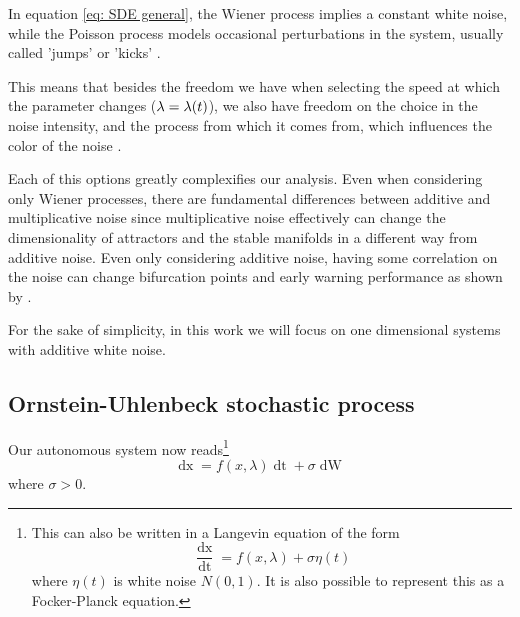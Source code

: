 In equation \eqref{eq: SDE general}, the Wiener process implies a constant white noise, while the Poisson process models occasional perturbations in the system, usually called 'jumps' or 'kicks' \citep{bibid}.

This means that besides the freedom we have when selecting the speed at which the parameter changes ($\lambda=\lambda(t)$), we also have freedom on the choice in the noise intensity, and the process from which it comes from, which influences the color of the noise \citep{Kaur2022}. 

Each of this options greatly complexifies our analysis. Even when considering only Wiener processes, there are fundamental differences between additive and multiplicative noise \citep{Alberti2021} since multiplicative noise effectively can change the dimensionality of attractors and  the stable manifolds in a different way from additive noise. 
Even only considering additive noise, having some correlation on the noise can change bifurcation points and early warning performance as shown by \cite{Kaur2022}.


For the sake of simplicity, in this work we will focus on  one dimensional systems with additive white noise. 



\subsection{Ornstein-Uhlenbeck stochastic process}


Our autonomous system now reads\footnote{This can also be written in a Langevin equation of the form 
	\begin{equation}
		\frac{\mathop{dx}}{\mathop{dt}}=  f(x,\lambda)  + \sigma \eta(t)  
		\label{Langev UB process}
	\end{equation}
	where $\eta(t)$ is white noise $N(0,1)$. It is also possible to represent this as a Focker-Planck equation.}
\begin{equation}
	\mathop{dx}=f(x,\lambda) \mathop{dt} + \sigma \mathop{dW}
	\label{eq: pre_U-B process}
\end{equation}
where $ \sigma>0$. 





